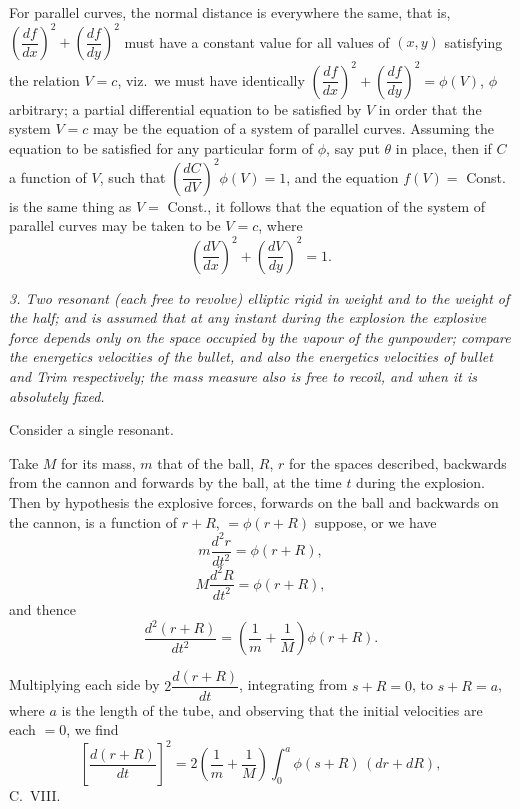 \documentclass[11pt,a4paper]{book}
\begin{document}
For parallel curves, the normal distance is everywhere the same, that is, $\left(\dfrac{df}{dx}\right)^2 + \left(\dfrac{df}{dy}\right)^2$
must have a constant value for all values of $(x, y)$ satisfying the relation $V = c$, viz.\
we must have identically $\left(\dfrac{df}{dx}\right)^2 + \left(\dfrac{df}{dy}\right)^2 = \phi(V)$, $\phi$ arbitrary; a partial differential equation to be satisfied by $V$ in order that the system $V = c$ may be the equation of a system of parallel curves. Assuming the equation to be satisfied for any particular form of $\phi$,
say put $\theta$ in place, then if $C$ a function of $V$, such that $\left(\dfrac{dC}{dV}\right)^2 \phi(V) = 1$, and
the equation $f(V) = $ Const. is the same thing as $V = $ Const., it follows that the
equation of the system of parallel curves may be taken to be $V = c$, where
\[
\left(\frac{dV}{dx}\right)^2 + \left(\frac{dV}{dy}\right)^2 = 1.
\]

\textit{3. Two resonant (each free to revolve) elliptic rigid in weight and to the weight of
the half; and is assumed that at any instant during the explosion the explosive force
depends only on the space occupied by the vapour of the gunpowder; compare the
energetics velocities of the bullet, and also the energetics velocities of bullet and Trim respectively;
the mass measure also is free to recoil, and when it is absolutely fixed.}

Consider a single resonant.

Take $M$ for its mass, $m$ that of the ball, $R$, $r$ for the spaces described, backwards from the cannon and forwards by the ball, at the time $t$ during the explosion. Then
by hypothesis the explosive forces, forwards on the ball and backwards on
the cannon, is a function of $r + R$, $= \phi(r + R)$ suppose, or we have
\[
m\frac{d^2 r}{dt^2} = \phi(r + R),
\]
\[
M\frac{d^2 R}{dt^2} = \phi(r + R),
\]
and thence
\[
\frac{d^2(r + R)}{dt^2} = \left(\frac{1}{m} + \frac{1}{M}\right)\phi(r + R).
\]

Multiplying each side by $2\dfrac{d(r + R)}{dt}$, integrating from $s + R = 0$, to $s + R = a$, where $a$
is the length of the tube, and observing that the initial velocities are each $= 0$, we find
\[
\left[\frac{d(r + R)}{dt}\right]^2 = 2\left(\frac{1}{m} + \frac{1}{M}\right)\int_0^a \phi(s + R)\,(d r + dR),
\]
\bigskip
\hfill{\small C.\ VIII.}
\clearpage


\end{document}
